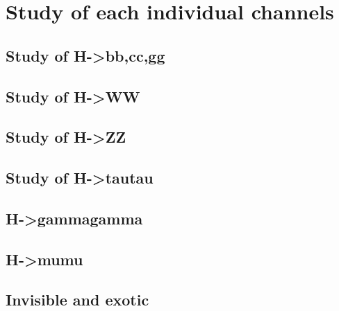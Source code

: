 \section{Study of each individual channels}
\label{sec:channels}

\subsection{Study of H->bb,cc,gg}

\clearpage

\subsection{Study of H->WW}

\clearpage

\subsection{Study of H->ZZ}

\clearpage

\subsection{Study of H->tautau}

\clearpage

\subsection{H->gammagamma}

\clearpage

\subsection{H->mumu}

\clearpage

\subsection{Invisible and exotic}

\clearpage

